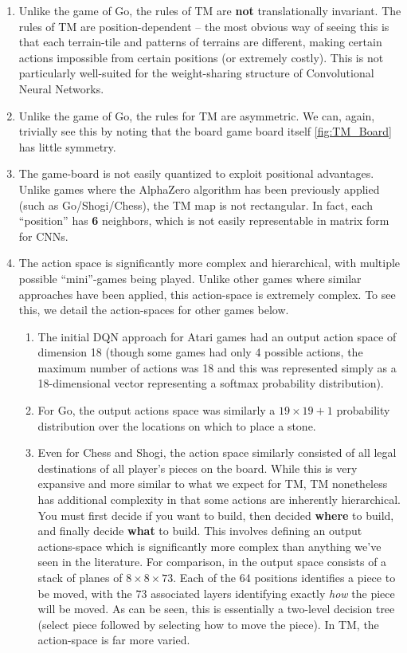 \documentclass[10pt,twocolumn,letterpaper]{article}
\begin{document}
\begin{enumerate}
    \item Unlike the game of Go, the rules of TM are \textbf{not} translationally invariant. The rules of TM are position-dependent -- the most obvious way of seeing this is that each terrain-tile and patterns of terrains are different, making certain actions impossible from certain positions (or extremely costly). This is not particularly well-suited for the weight-sharing structure of Convolutional Neural Networks.
    \item Unlike the game of Go, the rules for TM are asymmetric. We can, again, trivially see this by noting that the board game board itself \ref{fig:TM_Board} has little symmetry.
    \item The game-board is not easily quantized to exploit positional advantages. Unlike games where the AlphaZero algorithm has been previously applied (such as Go/Shogi/Chess), the TM map is not rectangular. In fact, each ``position'' has \textbf{6} neighbors, which is not easily representable in matrix form for CNNs.
    \item The action space is significantly more complex and hierarchical, with multiple possible ``mini''-games being played. Unlike other games where similar approaches have been applied, this action-space is extremely complex. To see this, we detail the action-spaces for other games below.
    \begin{enumerate}
        \item The initial DQN approach for Atari games had an output action space of dimension 18 (though some games had only 4 possible actions, the maximum number of actions was 18 and this was represented simply as a 18-dimensional vector representing a softmax
        probability distribution).
        \item For Go, the output actions space was similarly a $19\times19 + 1$ probability distribution over the locations on which to place a stone. 
        \item Even for Chess and Shogi, the action space similarly consisted of all legal destinations of all player's pieces on the board. While this is very expansive and more similar to what we expect for TM, TM nonetheless has additional complexity in that some actions are inherently hierarchical. You must first decide if you want to build, then decided \textbf{where} to build, and finally decide \textbf{what} to build. This involves defining an output actions-space which is significantly more complex than anything we've seen in the literature. For comparison, in \cite{AlphaZero} the output space consists of a stack of planes of $8\times 8 \times 73$. Each of the 64 positions identifies a piece to be moved, with the 73 associated layers identifying exactly \textit{how} the piece will be moved. As can be seen, this is essentially a two-level decision tree (select piece followed by selecting how to move the piece). In TM, the action-space is far more varied.

\end{enumerate}
\end{enumerate}
\end{document}
